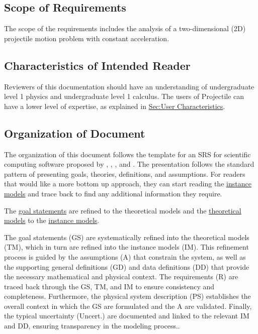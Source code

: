 \documentclass[12pt]{article}
\begin{document}
\subsection{Scope of Requirements}
\label{Sec:ReqsScope}
The scope of the requirements includes the analysis of a two-dimensional (2D) projectile motion problem with constant acceleration.

\subsection{Characteristics of Intended Reader}
\label{Sec:ReaderChars}
Reviewers of this documentation should have an understanding of undergraduate level 1 physics and undergraduate level 1 calculus. The users of Projectile can have a lower level of expertise, as explained in \hyperref[Sec:UserChars]{Sec:User Characteristics}.

\subsection{Organization of Document}
\label{Sec:DocOrg}
The organization of this document follows the template for an SRS for scientific computing software proposed by \cite{koothoor2013}, \cite{smithLai2005}, \cite{smithEtAl2007}, and \cite{smithKoothoor2016}. The presentation follows the standard pattern of presenting goals, theories, definitions, and assumptions. For readers that would like a more bottom up approach, they can start reading the \hyperref[Sec:IMs]{instance models} and trace back to find any additional information they require.

The \hyperref[Sec:GoalStmt]{goal statements} are refined to the theoretical models and the \hyperref[Sec:TMs]{theoretical models} to the \hyperref[Sec:IMs]{instance models}.

The goal statements (GS) are systematically refined into the theoretical models (TM), which in turn are refined into the instance models (IM). This refinement process is guided by the assumptions (A) that constrain the system, as well as the supporting general definitions (GD) and data definitions (DD) that provide the necessary mathematical and physical context. The requirements (R) are traced back through the GS, TM, and IM to ensure consistency and completeness. Furthermore, the physical system description (PS) establishes the overall context in which the GS are formulated and the A are validated. Finally, the typical uncertainty (Uncert.) are documented and linked to the relevant IM and DD, ensuring transparency in the modeling process..
\end{document}

